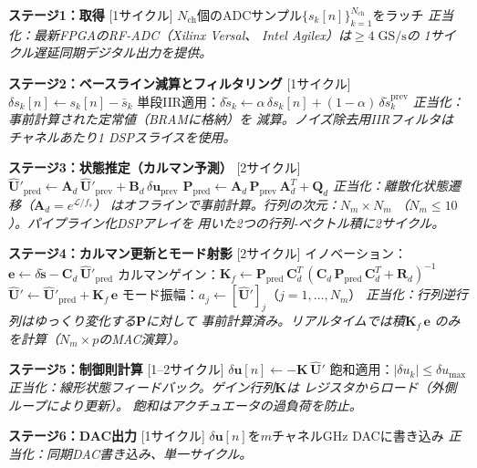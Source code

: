 \documentclass[12pt,twocolumn]{ltjsarticle}
\newcommand{\uu}{\mathbf{U}}
\newcommand{\kk}{\mathbf{K}}
\newcommand{\Lop}{\mathcal{L}}
\begin{document}
\begin{algorithm*}[t]
\caption{FPGAリアルタイムフィードバックパイプライン}
\label{alg:pipeline}
\begin{algorithmic}[1]
\Statex \textbf{ステージ1：取得} [1サイクル]
\State $N_{\mathrm{ch}}$個のADCサンプル$\{s_k[n]\}_{k=1}^{N_{\mathrm{ch}}}$をラッチ
\Statex \textit{正当化：最新FPGAのRF-ADC（Xilinx Versal、}
\Statex \textit{Intel Agilex）は$\geq 4\;\mathrm{GS/s}$の}
\Statex \textit{1サイクル遅延同期デジタル出力を提供。}

\Statex
\Statex \textbf{ステージ2：ベースライン減算とフィルタリング} [1サイクル]
\State $\delta s_k[n] \gets s_k[n] - \bar{s}_k$ 
\State 単段IIR適用：$\delta\tilde{s}_k \gets \alpha\,\delta s_k[n] + (1-\alpha)\,\delta\tilde{s}_k^{\mathrm{prev}}$
\Statex \textit{正当化：事前計算された定常値（BRAMに格納）を}
\Statex \textit{減算。ノイズ除去用IIRフィルタは}
\Statex \textit{チャネルあたり1 DSPスライスを使用。}

\Statex
\Statex \textbf{ステージ3：状態推定（カルマン予測）} [2サイクル]
\State $\hat{\uu}'_{\mathrm{pred}} \gets \mathbf{A}_d\,\hat{\uu}'_{\mathrm{prev}} + \mathbf{B}_d\,\delta\bm{u}_{\mathrm{prev}}$
\State $\mathbf{P}_{\mathrm{pred}} \gets \mathbf{A}_d\,\mathbf{P}_{\mathrm{prev}}\,\mathbf{A}_d^T + \mathbf{Q}_d$
\Statex \textit{正当化：離散化状態遷移（$\mathbf{A}_d = e^{\Lop/f_s}$）}
\Statex \textit{はオフラインで事前計算。行列の次元：$N_m \times N_m$}
\Statex \textit{（$N_m \leq 10$）。パイプライン化DSPアレイを}
\Statex \textit{用いた2つの行列-ベクトル積に2サイクル。}

\Statex
\Statex \textbf{ステージ4：カルマン更新とモード射影} [2サイクル]
\State イノベーション：$\bm{e} \gets \delta\tilde{\bm{s}} - \mathbf{C}_d\,\hat{\uu}'_{\mathrm{pred}}$
\State カルマンゲイン：$\mathbf{K}_f \gets \mathbf{P}_{\mathrm{pred}}\,\mathbf{C}_d^T\,(\mathbf{C}_d\,\mathbf{P}_{\mathrm{pred}}\,\mathbf{C}_d^T + \mathbf{R}_d)^{-1}$
\State $\hat{\uu}' \gets \hat{\uu}'_{\mathrm{pred}} + \mathbf{K}_f\,\bm{e}$
\State モード振幅：$a_j \gets [\hat{\uu}']_j$（$j = 1,\ldots,N_m$）
\Statex \textit{正当化：行列逆行列はゆっくり変化する$\mathbf{P}$に対して}
\Statex \textit{事前計算済み。リアルタイムでは積$\mathbf{K}_f\,\bm{e}$}
\Statex \textit{のみを計算（$N_m \times p$のMAC演算）。}

\Statex
\Statex \textbf{ステージ5：制御則計算} [1--2サイクル]
\State $\delta\bm{u}[n] \gets -\kk\,\hat{\uu}'$ 
\State 飽和適用：$|\delta u_k| \leq \delta u_{\max}$
\Statex \textit{正当化：線形状態フィードバック。ゲイン行列$\kk$は}
\Statex \textit{レジスタからロード（外側ループにより更新）。}
\Statex \textit{飽和はアクチュエータの過負荷を防止。}

\Statex
\Statex \textbf{ステージ6：DAC出力} [1サイクル]
\State $\delta\bm{u}[n]$を$m$チャネルGHz DACに書き込み
\Statex \textit{正当化：同期DAC書き込み、単一サイクル。}
\end{algorithmic}
\end{algorithm*}
\end{document}
